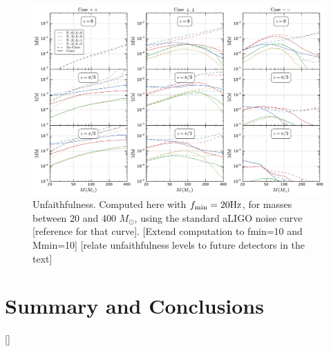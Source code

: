 \documentclass[aps,showpacs,twocolumn,
prd,superscriptaddress,nofootinbib]{revtex4-1}
\newcommand{\Msol}{M_{\odot}}
\newcommand{\SM}[1]{{\color{Red} #1}}
\begin{document}
\begin{figure}
  \centering
  \includegraphics[width=.98\linewidth]{plots/precMM_py.pdf}
  \caption{Unfaithfulness. Computed here with $f_{\rm min} = 20\mathrm{Hz}$, for masses between 20 and 400 $\Msol$, using the standard aLIGO noise curve \SM{[reference for that curve]}. \SM{[Extend computation to fmin=10 and Mmin=10]} \SM{[relate unfaithfulness levels to future detectors in the text]} }
  \label{fig:precunfaithfulness}
\end{figure}


\section{Summary and Conclusions}
\label{sec:discussion}

[]
\end{document}

